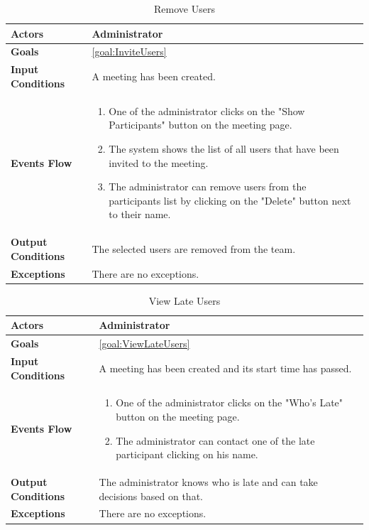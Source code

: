 \begin{table}[H]
	\centering
	\def\arraystretch{1.5}
	\begin{tabular}{|p{7cm}|p{7cm}|}
		\hline
		\textbf{Actors}            & Administrator    \\ \hline
		\textbf{Goals}             & \ref{goal:InviteUsers}           \\ \hline
		\textbf{Input Conditions}  & A meeting has been created.           \\ \hline
		\textbf{Events Flow}       & 
		\begin{enumerate}[topsep=0pt, leftmargin=*]
			\item One of the administrator clicks on the "Show Participants" button on the meeting page.
			\item The system shows the list of all users that have been invited to the meeting.
			\item The administrator can remove users from the participants list by clicking on the "Delete" button next to their name.
		\end{enumerate}            \\ \hline
		\textbf{Output Conditions} & The selected users are removed from the team.            \\ \hline
		\textbf{Exceptions}        & 
		There are no exceptions.         \\ \hline
	\end{tabular}
	\caption{Remove Users\label{UseCaseDescr:RemoveUsers}}
\end{table}

\begin{table}[H]
	\centering
	\def\arraystretch{1.5}
	\begin{tabular}{|p{7cm}|p{7cm}|}
		\hline
		\textbf{Actors}            & Administrator    \\ \hline
		\textbf{Goals}             & \ref{goal:ViewLateUsers}           \\ \hline
		\textbf{Input Conditions}  & A meeting has been created and its start time has passed.         \\ \hline
		\textbf{Events Flow}       &  
		\begin{enumerate}[topsep=0pt, leftmargin=*]
			\item One of the administrator clicks on the "Who's Late" button on the meeting page.
			\item The administrator can contact one of the late participant clicking on his name.
		\end{enumerate}             \\ \hline
		\textbf{Output Conditions} & The administrator knows who is late and can take decisions based on that.           \\ \hline
		\textbf{Exceptions}        & There are no exceptions.           \\ \hline
	\end{tabular}
	\caption{View Late Users\label{UseCaseDescr:LateUsers}}
\end{table}

